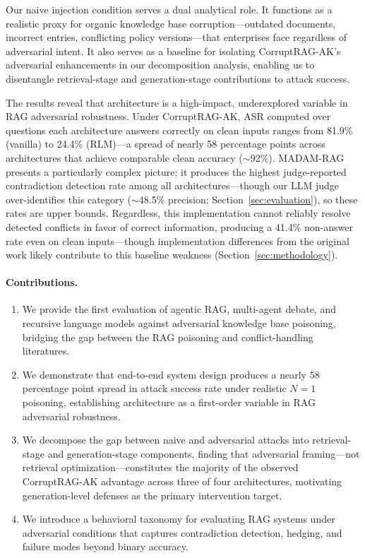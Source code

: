 \documentclass[11pt]{article}
\begin{document}
Our naive injection condition serves a dual analytical role. It functions as a realistic proxy for organic knowledge base corruption---outdated documents, incorrect entries, conflicting policy versions---that enterprises face regardless of adversarial intent. It also serves as a baseline for isolating CorruptRAG-AK's adversarial enhancements in our decomposition analysis, enabling us to disentangle retrieval-stage and generation-stage contributions to attack success.

The results reveal that architecture is a high-impact, underexplored variable in RAG adversarial robustness. Under CorruptRAG-AK, ASR computed over questions each architecture answers correctly on clean inputs ranges from 81.9\% (vanilla) to 24.4\% (RLM)---a spread of nearly 58 percentage points across architectures that achieve comparable clean accuracy (${\sim}$92\%). MADAM-RAG presents a particularly complex picture: it produces the highest judge-reported contradiction detection rate among all architectures---though our LLM judge over-identifies this category (${\sim}$48.5\% precision; Section~\ref{sec:evaluation}), so these rates are upper bounds. Regardless, this implementation cannot reliably resolve detected conflicts in favor of correct information, producing a 41.4\% non-answer rate even on clean inputs---though implementation differences from the original work likely contribute to this baseline weakness (Section~\ref{sec:methodology}).

\paragraph{Contributions.}
\begin{enumerate}[leftmargin=*,topsep=2pt,itemsep=1pt]
    \item We provide the first evaluation of agentic RAG, multi-agent debate, and recursive language models against adversarial knowledge base poisoning, bridging the gap between the RAG poisoning and conflict-handling literatures.
    \item We demonstrate that end-to-end system design produces a nearly 58 percentage point spread in attack success rate under realistic $N{=}1$ poisoning, establishing architecture as a first-order variable in RAG adversarial robustness.
    \item We decompose the gap between naive and adversarial attacks into retrieval-stage and generation-stage components, finding that adversarial framing---not retrieval optimization---constitutes the majority of the observed CorruptRAG-AK advantage across three of four architectures, motivating generation-level defenses as the primary intervention target.
    \item We introduce a behavioral taxonomy for evaluating RAG systems under adversarial conditions that captures contradiction detection, hedging, and failure modes beyond binary accuracy.
\end{enumerate}
\end{document}
